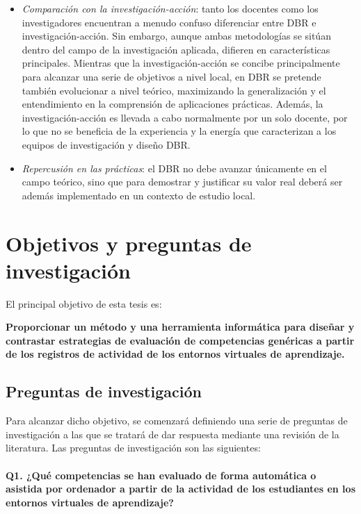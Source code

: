 \begin{itemize}
\item \emph{Comparación con la investigación-acción}: tanto los docentes como los investigadores encuentran a menudo confuso diferenciar entre DBR e investigación-acción. Sin embargo, aunque ambas metodologías se sitúan dentro del campo de la investigación aplicada, difieren en características principales. Mientras que la investigación-acción se concibe principalmente para alcanzar una serie de objetivos a nivel local, en DBR se pretende también evolucionar a nivel teórico, maximizando la generalización y el entendimiento en la comprensión de aplicaciones prácticas. Además, la investigación-acción es llevada a cabo normalmente por un solo docente, por lo que no se beneficia de la experiencia y la energía que caracterizan a los equipos de investigación y diseño DBR.
\item \emph{Repercusión en las prácticas}: el DBR no debe avanzar únicamente en el campo teórico, sino que para demostrar y justificar su valor real deberá ser además implementado en un contexto de estudio local.
\end{itemize}



\section{Objetivos y preguntas de investigación}
\label{sec:objetivos}

El principal objetivo de esta tesis es:

\bigskip
\textbf{Proporcionar un método y una herramienta informática para diseñar y contrastar estrategias de evaluación de competencias genéricas a partir de los registros de actividad de los entornos virtuales de aprendizaje.}
\bigskip

\subsection*{Preguntas de investigación}

Para alcanzar dicho objetivo, se comenzará definiendo una serie de preguntas de investigación a las que se tratará de dar respuesta mediante una revisión de la literatura. Las preguntas de investigación son las siguientes:

\paragraph*{Q1. ¿Qué competencias se han evaluado de forma automática o asistida por ordenador a partir de la actividad de los estudiantes en los entornos virtuales de aprendizaje?}

